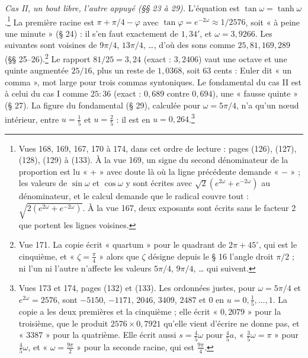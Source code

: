 \documentclass[11pt,a4paper]{article}
\begin{document}
\emph{Cas II, un bout libre, l'autre appuyé (§§ 23 à 29).} L'équation est $\tan\omega=\tanh\omega$.\footnote{Vues 168, 169, 167, 170 à 174, dans cet ordre de lecture : pages (126), (127), (128), (129) à (133). À la vue 169, un signe du second dénominateur de la proportion est lu « + » avec doute là où la ligne précédente demande « $-$ » ; les valeurs de $\sin\omega$ et $\cos\omega$ y sont écrites avec $\sqrt2(e^{2\omega}+e^{-2\omega})$ au dénominateur, et le calcul demande que le radical couvre tout : $\sqrt{2(e^{2\omega}+e^{-2\omega})}$. À la vue 167, deux exposants sont écrits sans le facteur 2 que portent les lignes voisines.} La première racine est $\pi+\pi/4-\varphi$ avec $\tan\varphi=e^{-2\omega}\approx 1/2576$, soit « à peine une minute » (§ 24) : il s'en faut exactement de $1{,}34'$, et $\omega=3{,}9266$. Les suivantes sont voisines de $9\pi/4$, $13\pi/4$, …, d'où des sons comme $25,81,169,289$ (§§ 25--26).\footnote{Vue 171. La copie écrit « quartum » pour le quadrant de $2\pi+45^\circ$, qui est le cinquième, et « $\zeta=\frac{\pi}{4}$ » alors que $\zeta$ désigne depuis le § 16 l'angle droit $\pi/2$ ; ni l'un ni l'autre n'affecte les valeurs $5\pi/4$, $9\pi/4$, … qui suivent.} Le rapport $81/25=3{,}24$ (exact : $3{,}2406$) vaut une octave et une quinte augmentée $25/16$, plus un reste de $1{,}0368$, soit $63$ cents : Euler dit « un comma », mot large pour trois commas syntoniques. Le fondamental du cas II est à celui du cas I comme $25:36$ (exact : $0{,}689$ contre $0{,}694$), une « fausse quinte » (§ 27). La figure du fondamental (§ 29), calculée pour $\omega=5\pi/4$, n'a qu'un nœud intérieur, entre $u=\frac15$ et $u=\frac25$ : il est en $u=0{,}264$.\footnote{Vues 173 et 174, pages (132) et (133). Les ordonnées justes, pour $\omega=5\pi/4$ et $e^{2\omega}=2576$, sont $-5150$, $-1171$, $2046$, $3409$, $2487$ et $0$ en $u=0,\frac15,\dots,1$. La copie a les deux premières et la cinquième ; elle écrit « $0{,}2079$ » pour la troisième, que le produit $2576\times0{,}7921$ qu'elle vient d'écrire ne donne pas, et « $3387$ » pour la quatrième. Elle écrit aussi $s=\frac45\omega$ pour $\frac45a$, « $\frac35\omega=\pi$ » pour $\frac45\omega$, et « $\omega=\frac{9\pi}{2}$ » pour la seconde racine, qui est $\frac{9\pi}{4}$.}
\end{document}
